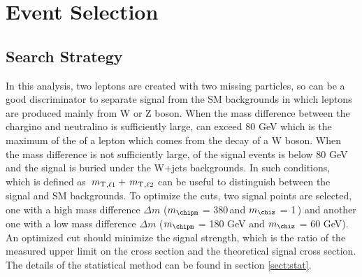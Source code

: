 \section{Event Selection}
\subsection{Search Strategy}
\label{sect:cuts}
In this analysis, two leptons are created with two missing particles, so \mttwo can be a good discriminator to separate signal 
from the SM backgrounds in which leptons are produced mainly from W or Z boson. When the mass difference between the chargino and neutralino 
is sufficiently large, \mttwo can exceed 80 GeV which is the maximum of the \mt of a lepton which comes from the decay of a W boson.
When the mass difference is not sufficiently large, \mttwo of the signal events is below 80 GeV and the signal is buried under the W+jets
backgrounds. In such conditions, \SumMT which is defined as $\,{m_{\rm T}}_{,\ell1} + \,{m_{\rm T}}_{,\ell2}$ can be useful to distinguish between the signal and 
SM backgrounds.
To optimize the cuts, two signal points are selected, one with a high mass difference 
$\Delta m$ ($m_{\chipm}$ = 380\,\GeV and $m_{\chiz}$ = 1\,\GeV) and another one with a low mass difference 
$\Delta m$ ($m_{\chipm}$ = 180 GeV and $m_{\chiz}$ = 60 GeV). An optimized cut should minimize the signal strength, 
which is the ratio of the measured upper limit on the cross section and the theoretical signal cross section. The details of the statistical 
method can be found in section \ref{sect:stat}.

